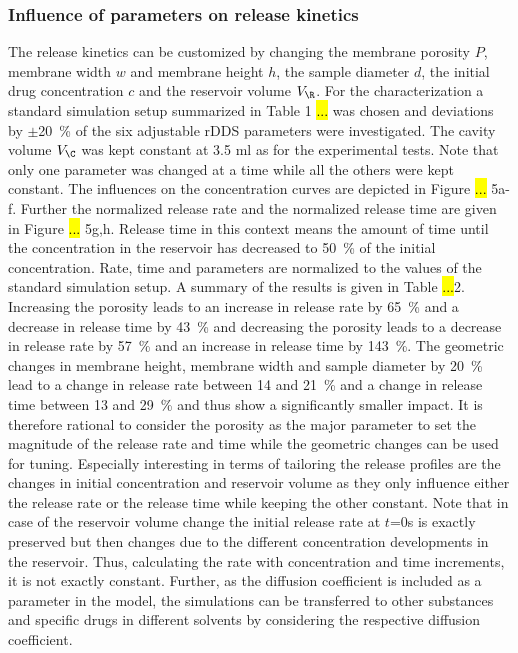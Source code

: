 \subsubsection{Influence of parameters on release kinetics}
The release kinetics can be customized by changing the membrane porosity $P$, membrane width $w$ and membrane height $h$, the sample diameter $d$, the initial drug concentration $c$ and the reservoir volume $V_\R$. For the characterization a standard simulation setup summarized in Table 1 \hl{...} was chosen and deviations by $\pm$20~\% of the six adjustable rDDS parameters were investigated. The cavity volume $V_\C$ was kept constant at 3.5 ml as for the experimental tests. Note that only one parameter was changed at a time while all the others were kept constant. The influences on the concentration curves are depicted in Figure \hl{...} 5a-f. Further the normalized release rate and the normalized release time are given in Figure \hl{...} 5g,h. Release time in this context means the amount of time until the concentration in the reservoir has decreased to 50~\% of the initial concentration. Rate, time and parameters are normalized to the values of the standard simulation setup. A summary of the results is given in Table \hl{...}2. Increasing the porosity leads to an increase in release rate by 65~\% and a decrease in release time by 43~\% and decreasing the porosity leads to a decrease in release rate by 57~\% and an increase in release time by 143~\%. The geometric changes in membrane height, membrane width and sample diameter by 20~\% lead to a change in release rate between 14 and 21~\% and a change in release time between 13 and 29~\% and thus show a significantly smaller impact. It is therefore rational to consider the porosity as the major parameter to set the magnitude of the release rate and time while the geometric changes can be used for tuning. Especially interesting in terms of tailoring the release profiles are the changes in initial concentration and reservoir volume as they only influence either the release rate or the release time while keeping the other constant. Note that in case of the reservoir volume change the initial release rate at $t$=0s is exactly preserved but then changes due to the different concentration developments in the reservoir. Thus, calculating the rate with concentration and time increments, it is not exactly constant. Further, as the diffusion coefficient is included as a parameter in the model, the simulations can be transferred to other substances and specific drugs in different solvents by considering the respective diffusion coefficient.

